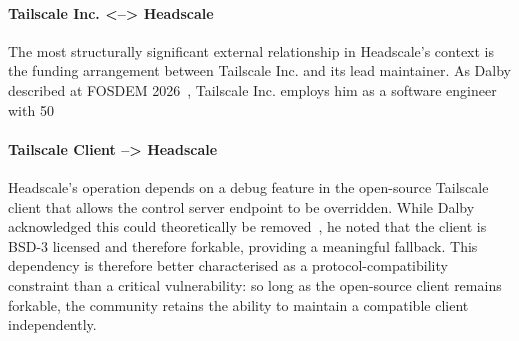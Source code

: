 \documentclass[11pt, a4paper]{article}
\begin{document}
\paragraph{Tailscale Inc. <--> Headscale}
The most structurally significant external relationship in Headscale's context is the funding arrangement between Tailscale Inc. and its lead maintainer. As Dalby described at FOSDEM 2026~\cite{headscale_FOSDEM2026_speech}, Tailscale Inc. employs him as a software engineer with 50%

\paragraph{Tailscale Client --> Headscale}
Headscale's operation depends on a debug feature in the open-source Tailscale client that allows the control server endpoint to be overridden. While Dalby acknowledged this could theoretically be removed~\cite{headscale_FOSDEM2026_speech}, he noted that the client is BSD-3 licensed and therefore forkable, providing a meaningful fallback. This dependency is therefore better characterised as a protocol-compatibility constraint than a critical vulnerability: so long as the open-source client remains forkable, the community retains the ability to maintain a compatible client independently.
\end{document}

